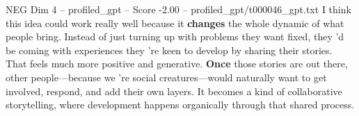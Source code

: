 \begin{textsample}{NEG Dim 4 – profiled\_gpt – Score -2.00 – profiled\_gpt/t000046\_gpt.txt}  \label{ex:f4_neg_015}
I think this idea could work really well because it \textbf{changes} the whole dynamic of what people bring.
Instead of just turning up with problems they want fixed, they ’d be coming with experiences they ’re keen to develop by sharing their stories.
That feels much more positive and generative. \textbf{Once} those stories are out there, other people—because we ’re social creatures—would naturally want to get involved, respond, and add their own layers.
It becomes a kind of collaborative storytelling, where development happens organically through that shared process.

\end{textsample}
